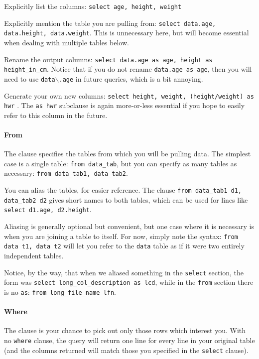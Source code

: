 Explicitly list the columns: {\tt select age, height, weight}

Explicitly mention the table you are pulling from: {\tt select data.age,
data.height, data.weight}. This is unnecessary here, but will become
essential when dealing with multiple tables below.

Rename the output columns: {\tt select data.age as age, height as\\
height\_\-in\_\-cm}. Notice that if you do not rename {\tt data.age as 
age}, then you will need to use {\tt data$\backslash$.age} in future
queries, which is a
bit annoying.

Generate your own new columns: {\tt select height, weight, (height/weight) as hwr}
. The {\tt as hwr} subclause is again more-or-less
essential if you hope to easily refer to this column in the future. 

\paragraph{From} The  clause specifies the tables from which
you will be pulling data. The simplest case is a single table: {\tt from
data\_tab}, but you can specify as many tables as necessary: {\tt from
data\_tab1, data\_tab2}. 

You can alias the tables, for easier reference. The clause {\tt from
data\_tab1 d1, data\_tab2 d2} gives short names to both tables, which can
be used for lines like {\tt select d1.age, d2.height}. 

Aliasing is generally optional but convenient, but one case where
it is necessary is when you are joining a table to itself.
For now, simply note the syntax: {\tt from data t1, data t2} will let
you refer to the {\tt data} table as if it were two entirely independent
tables. 

Notice, by the way, that when we aliased something in the {\tt select}
section, the form was {\tt select long\_col\_description as lcd}, while
in the {\tt from} section there is no {\tt as}: {\tt from long\_file\_name lfn}.

\paragraph{Where}
The  clause is your chance to pick out only those rows which
interest you. With no {\tt where} clause, the query will return one line
for every line in your original table (and the columns returned will
match those you specified in the {\tt select} clause).

